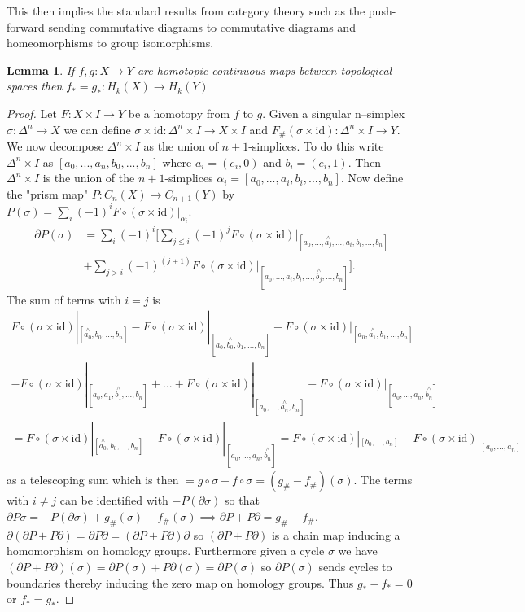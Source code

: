 \documentclass{article}
\newtheorem{lemma}[theorem]{Lemma}
\begin{document}
\noindent This then implies the standard results from category theory such as the push-forward sending commutative diagrams to commutative diagrams and homeomorphisms to group isomorphisms.

\begin{lemma}
If $f,g\colon X\to Y$ are homotopic continuous maps between topological spaces then $f_*=g_*\colon H_k(X)\to H_k(Y)$
\end{lemma}
\begin{proof}
Let $F\colon X\times I\to Y$ be a homotopy from $f$ to $g$. Given a singular n--simplex $\sigma\colon\Delta^n\to X$ we can define $\sigma\times\text{id}\colon\Delta^n\times I\to X\times I$ and $F_\#(\sigma\times\text{id})\colon\Delta^n\times I\to Y$. We now decompose $\Delta^n\times I$ as the union of $n+1$-simplices. To do this write $\Delta^n\times I$ as $[a_0,...,a_n,b_0,...,b_n]$ where $a_i=(e_i,0)$ and $b_i=(e_i,1)$. Then $\Delta^n\times I$ is the union of the $n+1$-simplices $\alpha_i=[a_0,...,a_i,b_i,...,b_n]$. Now define the "prism map" $P\colon C_n(X)\to C_{n+1}(Y)$ by $P(\sigma)=\sum_i(-1)^iF\circ(\sigma\times\text{id})|_{\alpha_i}$. 
\begin{align*}
\partial P(\sigma)&=\sum_i(-1)^i[\sum_{j\leq i}(-1)^jF\circ(\sigma\times\text{id})|_{[a_0,...,\overset{\wedge}{a_j},...,a_i,b_i,...,b_n]}\\&+\sum_{j> i}(-1)^{(j+1)}F\circ(\sigma\times\text{id})|_{[a_0,...,a_i,b_i,...,\overset{\wedge}{b_j},...,b_n]}].
\end{align*}
The sum of terms with $i=j$ is 
\begin{multline*}
F\circ(\sigma\times\text{id})|_{[\overset{\wedge}{a_0},b_0,...,b_n]}-F\circ(\sigma\times\text{id})|_{[a_0,\overset{\wedge}{b_0},b_1,...,b_n]}+F\circ(\sigma\times\text{id})|_{[a_0,\overset{\wedge}{a_1},b_1,...,b_n]}\\-F\circ(\sigma\times\text{id})|_{[a_0,a_1,\overset{\wedge}{b_1},...,b_n]}+...+F\circ(\sigma\times\text{id})|_{[a_0,...,\overset{\wedge}{a_n},b_n]}-F\circ(\sigma\times\text{id})|_{[a_0,...,a_n,\overset{\wedge}{b_n}]}\\=F\circ(\sigma\times\text{id})|_{[\overset{\wedge}{a_0},b_0,...,b_n]}-F\circ(\sigma\times\text{id})|_{[a_0,...,a_n,\overset{\wedge}{b_n}]}=F\circ(\sigma\times\text{id})|_{[b_0,...,b_n]}-F\circ(\sigma\times\text{id})|_{[a_0,...,a_n]}
\end{multline*}as a telescoping sum which is then $=g\circ\sigma-f\circ\sigma=(g_\#-f_\#)(\sigma)$. The terms with $i\neq j$ can be identified with $-P(\partial\sigma)$ so that $\partial P\sigma=-P(\partial\sigma)+g_\#(\sigma)-f_\#(\sigma)\implies\partial P + P\partial=g_\#-f_\#$. $\partial(\partial P + P\partial)=\partial P\partial=(\partial P + P\partial)\partial$ so $(\partial P + P\partial)$ is a chain map inducing a homomorphism on homology groups. Furthermore given a cycle $\sigma$ we have $(\partial P + P\partial)(\sigma)=\partial P(\sigma) + P\partial(\sigma)=\partial P(\sigma)$ so $\partial P(\sigma)$ sends cycles to boundaries thereby inducing the zero map on homology groups. Thus $g_*-f_*=0$ or $f_*=g_*$.
\end{proof}
\end{document}

